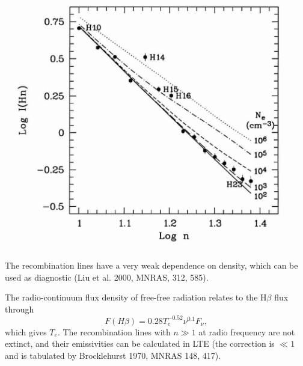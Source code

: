 




\begin{floatingfigure}{14cm}
\includegraphics[width=13cm,height=!]{./C/Hn_Ne.jpg}
\end{floatingfigure}  The recombination lines have a very weak
dependence on density, which can be used as diagnostic (Liu et
al. 2000, MNRAS, 312, 585).


The radio-continuum flux density of free-free radiation relates to the
H$\beta$ flux through
\[
F(H\beta) = 0.28 T_e^{-0.52} \nu^{0.1} F_\nu,
\]
which gives $T_e$. The recombination lines with $n\gg 1$ at radio
frequency are not extinct, and their emissivities can be calculated in
LTE (the correction is $\ll 1$ and is tabulated by Brocklehurst 1970,
MNRAS 148, 417).



